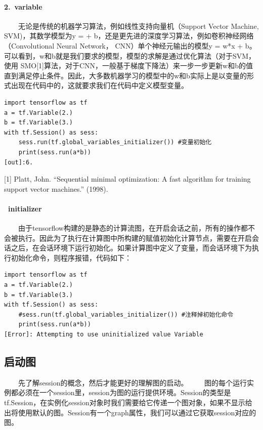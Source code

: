 \paragraph{2.~variable}\label{variable}

  无论是传统的机器学习算法，例如线性支持向量机（Support Vector Machine,
SVM)，其数学模型为y = +
b，还是更先进的深度学习算法，例如卷积神经网络（Convolutional Neural
Network， CNN）单个神经元输出的模型y = w*x +
b。可以看到，w和b就是我们要求的模型，模型的求解是通过优化算法（对于SVM，使用
SMO{[}1{]}算法，对于CNN，一般基于梯度下降法）来一步一步更新w和b的值直到满足停止条件。因此，大多数机器学习的模型中的w和b实际上是以变量的形式出现在代码中的，这就要求我们在代码中定义模型变量。

\begin{verbatim}
import tensorflow as tf
a = tf.Variable(2.)
b = tf.Variable(3.)
with tf.Session() as sess:
    sess.run(tf.global_variables_initializer()) #变量初始化
    print(sess.run(a*b))
[out]:6.
\end{verbatim}

{[}1{]} Platt, John. ``Sequential minimal optimization: A fast algorithm
for training support vector machines.'' (1998).

\paragraph{~initializer}\label{initializer}

  由于tensorflow构建的是静态的计算流图，在开启会话之前，所有的操作都不会被执行。因此为了执行在计算图中所构建的赋值初始化计算节点，需要在开启会话之后，在会话环境下运行初始化。如果计算图中定义了变量，而会话环境下为执行初始化命令，则程序报错，代码如下：

\begin{verbatim}
import tensorflow as tf
a = tf.Variable(2.)
b = tf.Variable(3.)
with tf.Session() as sess:
    #sess.run(tf.global_variables_initializer()) #注释掉初始化命令
    print(sess.run(a*b))
[Error]: Attempting to use uninitialized value Variable
\end{verbatim}

\subsection{启动图}\label{ux542fux52a8ux56fe}

  先了解session的概念，然后才能更好的理解图的启动。
  图的每个运行实例都必须在一个session里，session为图的运行提供环境。Session的类型是tf.Session，在实例化session对象时我们需要给它传递一个图对象，如果不显示给出将使用默认的图。Session有一个graph属性，我们可以通过它获取session对应的图。

